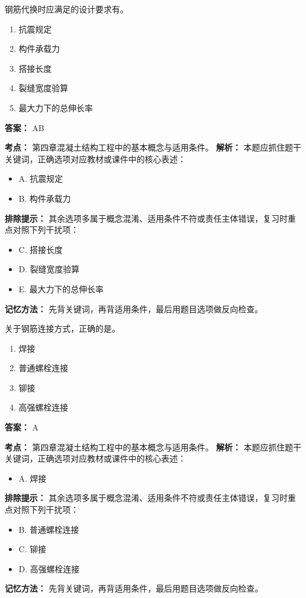 \documentclass[UTF8,fontset=fandol,11pt]{ctexart}
\begin{document}
\begin{quizbox}[title={第 16 题}]
钢筋代换时应满足的设计要求有。\\
\begin{enumerate}[label=\Alph*.]
\item 抗震规定
\item 构件承载力
\item 搭接长度
\item 裂缝宽度验算
\item 最大力下的总伸长率
\end{enumerate}
\textbf{答案：} AB
\vspace{0.25em}
\begin{answerbox}[title={考点解析}]
\textbf{考点：} 第四章混凝土结构工程中的基本概念与适用条件。
\textbf{解析：} 本题应抓住题干关键词，正确选项对应教材或课件中的核心表述：
\begin{itemize}
\item A. 抗震规定
\item B. 构件承载力
\end{itemize}
\textbf{排除提示：} 其余选项多属于概念混淆、适用条件不符或责任主体错误，复习时重点对照下列干扰项：
\begin{itemize}
\item C. 搭接长度
\item D. 裂缝宽度验算
\item E. 最大力下的总伸长率
\end{itemize}
\textbf{记忆方法：} 先背关键词，再背适用条件，最后用题目选项做反向检查。
\end{answerbox}
\end{quizbox}

\begin{quizbox}[title={第 17 题}]
关于钢筋连接方式，正确的是。\\
\begin{enumerate}[label=\Alph*.]
\item 焊接
\item 普通螺栓连接
\item 铆接
\item 高强螺栓连接
\end{enumerate}
\textbf{答案：} A
\vspace{0.25em}
\begin{answerbox}[title={考点解析}]
\textbf{考点：} 第四章混凝土结构工程中的基本概念与适用条件。
\textbf{解析：} 本题应抓住题干关键词，正确选项对应教材或课件中的核心表述：
\begin{itemize}
\item A. 焊接
\end{itemize}
\textbf{排除提示：} 其余选项多属于概念混淆、适用条件不符或责任主体错误，复习时重点对照下列干扰项：
\begin{itemize}
\item B. 普通螺栓连接
\item C. 铆接
\item D. 高强螺栓连接
\end{itemize}
\textbf{记忆方法：} 先背关键词，再背适用条件，最后用题目选项做反向检查。
\end{answerbox}
\end{quizbox}
\end{document}
